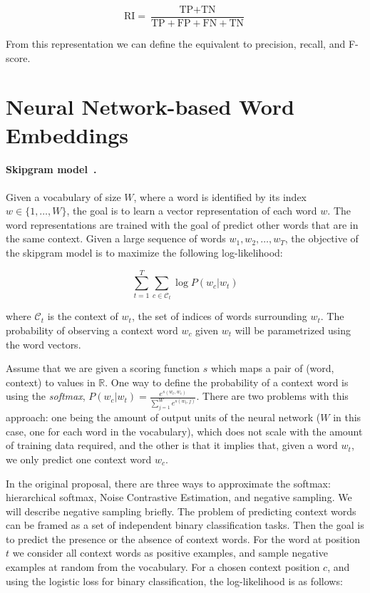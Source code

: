 \begin{equation}
    \text{RI} = \frac{ \text{TP} + \text{TN} }{ \text{TP} + \text{FP} + \text{FN} + \text{TN}}
\end{equation}

From this representation we can define the equivalent to precision, recall, and
F-score.

\section{Neural Network-based Word Embeddings}



\paragraph{Skipgram model~\cite{mikolov2013efficient}.}
%
Given a vocabulary of size $W$, where a word is identified by its index $w \in
\{1, \ldots, W\}$, the goal is to learn a vector representation of each word $w$.
%
The word representations are trained with the goal of predict other words that
are in the same context.
%
Given a large sequence of words $w_1, w_2, \ldots, w_T$, the objective of the
skipgram model is to maximize the following log-likelihood:

$$ \sum_{t=1}^T\sum_{c\in \mathcal{C}_t} \log P(w_c | w_t) $$

\noindent where $\mathcal{C}_t$ is the context of $w_t$, the set of indices of
words surrounding $w_t$. 
%
The probability of observing a context word $w_c$ given $w_t$ will be
parametrized using the word vectors.


Assume that we are given a scoring function $s$ which maps a pair of (word,
context) to values in $\mathbb{R}$.
%
One way to define the probability of a context word is using the {\em softmax},
$ P(w_c | w_t) = \frac{ \mathit{e}^{s(w_t, w_c)} }{ \sum_{j=1}^W \mathit{e}^{s(w_t, j)} } $.
%
There are two problems with this approach: one being the amount of output units
of the neural network ($W$ in this case, one for each word in the vocabulary),
which does not scale with the amount of training data required, and the other is
that it implies that, given a word $w_t$, we only predict one context word
$w_c$.


In the original proposal, there are three ways to approximate the softmax:
%
hierarchical softmax,
%
Noise Contrastive Estimation, and
%
negative sampling.
%
We will describe negative sampling briefly.
% 
The problem of predicting context words can be framed as a set of independent
binary classification tasks.
%
Then the goal is to predict the presence or the absence of context words. 
%
For the word at position $t$ we consider all context words as positive examples,
and sample negative examples at random from the vocabulary.
%
For a chosen context position $c$, and using the logistic loss for binary
classification, the log-likelihood is as follows:


